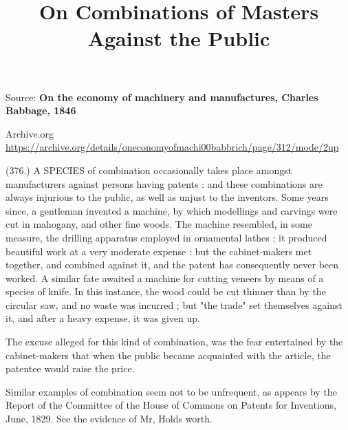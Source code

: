 \documentclass{article}
\begin{document}
\title{On Combinations of Masters Against the Public}

\maketitle


Source: \textbf{On the economy of machinery and manufactures, Charles Babbage, 1846}


Archive.org \href{https://archive.org/details/oneconomyofmachi00babbrich/page/312/mode/2up}{https://archive.org/details/oneconomyofmachi00babbrich/page/312/mode/2up} 


(376.) A SPECIES of combination occasionally takes place amongst manufacturers against persons having patents : and these combinations are always injurious to the public, as well as unjust to the inventors. Some years since, a gentleman invented a machine, by which modellings and carvings were cut in mahogany, and other fine woods. The machine resembled, in some measure, the drilling apparatus employed in ornamental lathes ; it produced beautiful work at a very moderate expense : but the cabinet-makers met together, and combined against it, and the patent has consequently never been worked. A similar fate awaited a machine for cutting veneers by means of a species of knife. In this instance, the wood could be cut thinner than by the circular saw, and no waste was incurred ; but "the trade" set themselves against it, and after a heavy expense, it was given up.


The excuse alleged for this kind of combination, was the fear entertained by the cabinet-makers that when the public became acquainted with the article, the patentee would raise the price.


Similar examples of combination seem not to be unfrequent, as appears by the Report of the Committee of the House of Commons on Patents for Inventions, June, 1829. See the evidence of Mr, Holds worth.
\end{document}
